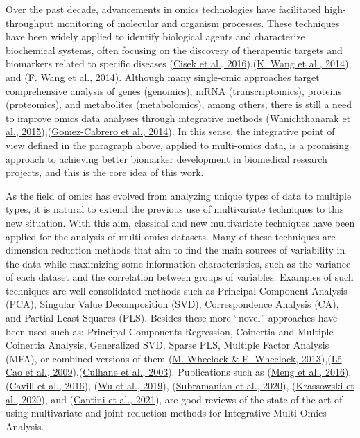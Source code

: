 \documentclass[a4paper, nobind]{templates/ociamthesis}
\begin{document}
Over the past decade, advancements in omics technologies have facilitated high-throughput monitoring of molecular and organism processes. These techniques have been widely applied to identify biological agents and characterize biochemical systems, often focusing on the discovery of therapeutic targets and biomarkers related to specific diseases (\protect\hyperlink{ref-cisek_application_2016}{Cisek et al., 2016}),(\protect\hyperlink{ref-wang_proteomics_2014}{K. Wang et al., 2014}), and (\protect\hyperlink{ref-wang_circulating_2014}{F. Wang et al., 2014}). Although many single-omic approaches target comprehensive analysis of genes (genomics), mRNA (transcriptomics), proteins (proteomics), and metabolites (metabolomics), among others, there is still a need to improve omics data analyses through integrative methods (\protect\hyperlink{ref-wanichthanarak_genomic_2015}{Wanichthanarak et al., 2015}),(\protect\hyperlink{ref-gomez-cabrero_data_2014}{Gomez-Cabrero et al., 2014}). In this sense, the integrative point of view defined in the paragraph above, applied to multi-omics data, is a promising approach to achieving better biomarker development in biomedical research projects, and this is the core idea of this work.

As the field of omics has evolved from analyzing unique types of data to multiple types, it is natural to extend the previous use of multivariate techniques to this new situation. With this aim, classical and new multivariate techniques have been applied for the analysis of multi-omics datasets. Many of these techniques are dimension reduction methods that aim to find the main sources of variability in the data while maximizing some information characteristics, such as the variance of each dataset and the correlation between groups of variables. Examples of such techniques are well-consolidated methods such as Principal Component Analysis (PCA), Singular Value Decomposition (SVD), Correspondence Analysis (CA), and Partial Least Squares (PLS). Besides these more ``novel'' approaches have been used such as: Principal Components Regression, Coinertia and Multiple Coinertia Analysis, Generalized SVD, Sparse PLS, Multiple Factor Analysis (MFA), or combined versions of them (\protect\hyperlink{ref-mwheelock_trials_2013}{M. Wheelock \& E. Wheelock, 2013}),(\protect\hyperlink{ref-le_cao_sparse_2009}{Lê Cao et al., 2009}),(\protect\hyperlink{ref-culhane_cross-platform_2003}{Culhane et al., 2003}). Publications such as (\protect\hyperlink{ref-meng_dimension_2016}{Meng et al., 2016}), (\protect\hyperlink{ref-cavill_transcriptomic_2016}{Cavill et al., 2016}), (\protect\hyperlink{ref-wu_selective_2019}{Wu et al., 2019}), (\protect\hyperlink{ref-subramanian_multi-omics_2020}{Subramanian et al., 2020}), (\protect\hyperlink{ref-krassowski_state_2020}{Krassowski et al., 2020}), and (\protect\hyperlink{ref-cantini_benchmarking_2021}{Cantini et al., 2021}), are good reviews of the state of the art of using multivariate and joint reduction methods for Integrative Multi-Omics Analysis.
\end{document}

